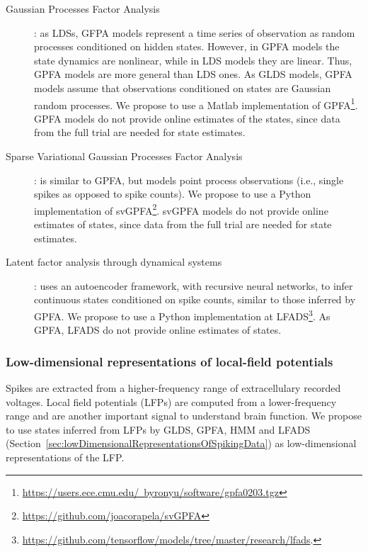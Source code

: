 \documentclass[a4paper,11point]{article}
\begin{document}
\begin{description}
    \item[Gaussian Processes Factor Analysis]\citep[GPFA;][]{yuEtAl09}: as
        LDSs, GFPA models represent a time series of observation as random
        processes conditioned on hidden states. However, in GPFA models the
        state dynamics are nonlinear, while in LDS models they are linear.
        Thus, GPFA models are more general than LDS ones. As GLDS models, GPFA
        models assume that observations conditioned on states are Gaussian
        random processes. We propose to use a Matlab implementation of
        GPFA\footnote{\href{https://users.ece.cmu.edu/~byronyu/software/gpfa0203.tgz}{https://users.ece.cmu.edu/~byronyu/software/gpfa0203.tgz}}.
        GPFA models do not provide online estimates of the states, since data
        from the full trial are needed for state estimates.

    \item[Sparse Variational Gaussian Processes Factor
        Analysis]\citep[svGPFA;][]{dunckerAndSahani18}: is similar to GPFA, but
        models point process observations (i.e., single spikes as opposed to
        spike counts). We propose to use a Python implementation of
        svGPFA\footnote{\href{https://github.com/joacorapela/svGPFA}{https://github.com/joacorapela/svGPFA}}.
        svGPFA models do not provide online estimates of states, since data
        from the full trial are needed for state estimates.

    \item[Latent factor analysis through dynamical
        systems]\citep[LFADS;][]{pandarinathEtAl18}: uses an autoencoder
        framework, with recursive neural networks, to infer continuous states
        conditioned on spike counts, similar to those inferred by GPFA. We
        propose to use a Python implementation at
        LFADS\footnote{\href{https://github.com/tensorflow/models/tree/master/research/lfads}{https://github.com/tensorflow/models/tree/master/research/lfads}.}.
        As GPFA, LFADS do not provide online estimates of states.

\end{description}

\subsubsection{Low-dimensional representations of local-field potentials}
\label{sec:lowDimensionalRepresentationsOfLFPs}

Spikes are extracted from a higher-frequency range of extracellulary recorded
voltages. Local field potentials (LFPs) are computed from a lower-frequency
range and are another important signal to understand brain function. We propose
to use states inferred from LFPs by GLDS, GPFA, HMM and LFADS
(Section~\ref{sec:lowDimensionalRepresentationsOfSpikingData}) as
low-dimensional representations of the LFP.
\end{document}

